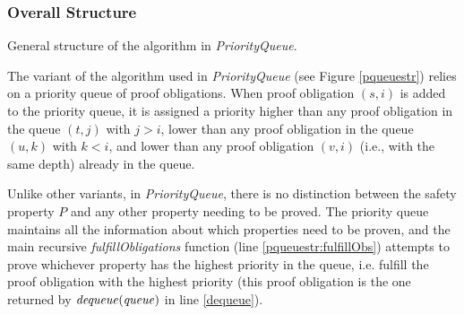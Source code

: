 \documentclass[12pt,a4paper,twoside,openright]{report}
\begin{document}
{{\subsubsection{Overall Structure}
\begin{algorithm}[t]
\DontPrintSemicolon
{}
\Fn{fulfillObligations$(M,[F_0,\ldots,F_k],{\it queue}])$ \label{pqueuestr:fulfillObs}}{
  \Let{$((s,i), {\it q}) = {\it dequeue(queue)}$ \label{dequeue}}{
  \lIf{$F_{i - 1} \wedge T \Rightarrow \neg s'$}{\Return{${\it pushFrame(M, [F_0, \dots, F_k], q, (s,i))}$} \label{pqueuestr:pushFrame}}
  }
  \lElse{\Let{${\it cti = nextCTI(F_{i - 1} \wedge T \Rightarrow \neg s')}$}{
      \If{$I \Rightarrow \neg {\it cti}$ \label{pqueuestr:preprop}}{
        \Let{${\it (fixed, [G_0, \ldots, G_k], d) = propagate([F_0 \cup \{\neg cti\}, F_1, \ldots, F_k], {\it \neg cti})}$ \label{pqueuestr:propagate}}{
          \lIf{\it fixed}{\Return{True} \label{pqueuestr:fix}}
          \Return{${\it fulfillObligation(M, [G_0 , \ldots, G_k], (generalize(\neg cti, d),d))}$ \label{pqueuestr:rec}}
        }
      }
      \lElse{\Return{False}}}}
}
\caption{General structure of the algorithm in {\it PriorityQueue}.}
\label{pqueuestr}
\end{algorithm}

The variant of the algorithm used in \emph{PriorityQueue} (see Figure \ref{pqueuestr})
relies on a priority queue of proof obligations.
When proof obligation $(s,i)$ is added to the priority queue,
it is assigned a priority higher than any proof obligation in the queue $(t,j)$ with $j > i$,
lower than any proof obligation in the queue $(u,k)$ with $k < i$, and lower
than any proof obligation $(v,i)$ (i.e., with the same depth) already in the queue.

Unlike other variants, in {\it PriorityQueue}, there is
no distinction between the safety property $P$ and any other property
needing to be proved.
The priority queue maintains all the information about which properties need to be
proven, and the main recursive {\it fulfillObligations} function (line \ref{pqueuestr:fulfillObs}) attempts to prove
whichever property has the highest priority in the queue, i.e. fulfill the proof obligation with the highest priority (this proof obligation
is the one returned by ${\it dequeue(queue)}$ in line \ref{dequeue}).

}}
\end{document}
